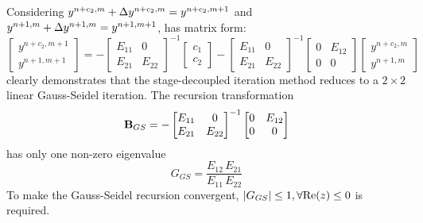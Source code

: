 Considering $y^{n+c_2,m} + {\Delta} y^{n+c_2,m} = y^{n+c_2,m+1}$ and
$y^{n+1,m} + {\Delta} y^{n+1,m} = y^{n+1,m+1}$,
 has matrix form:
\begin{equation}
    \begin{bmatrix}
        y^{n+c_2, m + 1} \\
        y^{n+1, m + 1}
    \end{bmatrix}
    =
    -\begin{bmatrix}
        E_{11} & 0      \\
        E_{21} & E_{22}
    \end{bmatrix}^{-1} \begin{bmatrix}
        c_1 \\c_2
    \end{bmatrix}
    -
    \begin{bmatrix}
        E_{11} & 0      \\
        E_{21} & E_{22}
    \end{bmatrix}^{-1}
    \begin{bmatrix}
        0 & E_{12} \\
        0 & 0
    \end{bmatrix}
    \begin{bmatrix}
        y^{n+c_2, m} \\
        y^{n+1, m}
    \end{bmatrix}
    \label{eq:scalarGSMat}
\end{equation}
 clearly demonstrates that the stage-decoupled
iteration method reduces to a $2\times2$ linear Gauss-Seidel iteration.
The recursion transformation
\begin{equation}
    \mathbf{B}_{GS} = -\begin{bmatrix}
        E_{11} & 0      \\
        E_{21} & E_{22}
    \end{bmatrix}^{-1}
    \begin{bmatrix}
        0 & E_{12} \\
        0 & 0
    \end{bmatrix}
\end{equation}
has only one non-zero eigenvalue
\begin{equation}
    G_{GS} = \frac{E_{12}\,E_{21}}{E_{11}\,E_{22}}
\end{equation}
To make the Gauss-Seidel recursion 
convergent, $|G_{GS}|\leq 1, \forall \mathrm{Re}(z) \leq 0$ is required.

